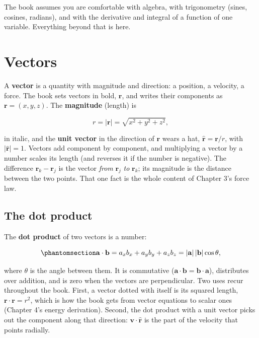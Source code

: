 \documentclass[
  10.5pt,
  letterpaper,
]{scrbook}
\theoremstyle{plain}
\theoremstyle{remark}
\begin{document}
The book assumes you are comfortable with algebra, with trigonometry
(sines, cosines, radians), and with the derivative and integral of a
function of one variable. Everything beyond that is here.

\section{Vectors}\label{vectors}

A \textbf{vector} is a quantity with magnitude and direction: a
position, a velocity, a force. The book sets vectors in bold,
\(\mathbf{r}\), and writes their components as
\(\mathbf{r} = (x, y, z)\). The \textbf{magnitude} (length) is

\[
r = |\mathbf{r}| = \sqrt{x^2 + y^2 + z^2},
\]

in italic, and the \textbf{unit vector} in the direction of
\(\mathbf{r}\) wears a hat, \(\hat{\mathbf{r}} = \mathbf{r}/r\), with
\(|\hat{\mathbf{r}}| = 1\). Vectors add component by component, and
multiplying a vector by a number scales its length (and reverses it if
the number is negative). The difference \(\mathbf{r}_k - \mathbf{r}_j\)
is the vector \emph{from} \(\mathbf{r}_j\) \emph{to} \(\mathbf{r}_k\);
its magnitude is the distance between the two points. That one fact is
the whole content of Chapter 3's force law.

\subsection{The dot product}\label{the-dot-product}

The \textbf{dot product} of two vectors is a number:

\begin{equation}\protect\phantomsection\label{eq-dot}{
\mathbf{a}\cdot\mathbf{b} = a_x b_x + a_y b_y + a_z b_z = |\mathbf{a}|\,|\mathbf{b}|\cos\theta,
}\end{equation}

where \(\theta\) is the angle between them. It is commutative
(\(\mathbf{a}\cdot\mathbf{b} = \mathbf{b}\cdot\mathbf{a}\)), distributes
over addition, and is zero when the vectors are perpendicular. Two uses
recur throughout the book. First, a vector dotted with itself is its
squared length, \(\mathbf{r}\cdot\mathbf{r} = r^2\), which is how the
book gets from vector equations to scalar ones (Chapter 4's energy
derivation). Second, the dot product with a unit vector picks out the
component along that direction: \(\mathbf{v}\cdot\hat{\mathbf{r}}\) is
the part of the velocity that points radially.
\end{document}
